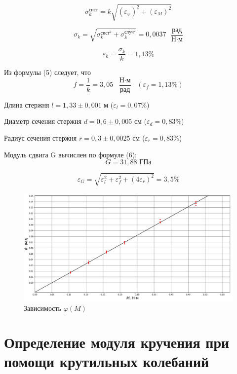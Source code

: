 \documentclass[a4paper, 12pt]{article}
\begin{document}
\[ \sigma_k^{\text{сист}} = k\sqrt{(\varepsilon_{\varphi})^2+(\varepsilon_M)^2}\]

\[ \sigma_{k} = \sqrt{\sigma_k^{{\text{сист}}^2}+\sigma_k^{{\text{случ}}^2}} = 0,0037 \text{ }\frac{\text{рад}}{\text{Н$\cdot$м}}\]

\[ \varepsilon_k = \frac{\sigma_k}{k} = 1,13 \%\]

Из формулы (5) следует, что
\[f = \frac{1}{k} = 3,05 \text{ }\frac{\text{Н$\cdot$м}}{\text{рад}}\text{ }(\varepsilon_f = 1,13 \%)\]

Длина стержня $l = 1,33 \pm 0,001$ м ($\varepsilon_l = 0,07\%$)

Диаметр сечения стержня $d = 0,6 \pm 0,005$ см ($\varepsilon_d = 0,83\%$)

Радиус сечения стержня $r = 0,3 \pm 0,0025$ см ($\varepsilon_r = 0,83\%$)

Модуль сдвига G вычислен по формуле (6):
\[G = 31,88 \text{ ГПа}\]

\[ \varepsilon_G = \sqrt{\varepsilon_l^2+\varepsilon_f^2+(4\varepsilon_r)^2} = 3,5 \%\]

 \begin{figure}[h!]
     \centering
     \includegraphics[scale = 0.5]{plota.png}
     \caption{Зависимость $\varphi(M)$}
     \label{fig:enter-label}
 \end{figure}


\section{Определение модуля кручения при помощи крутильных колебаний}
\end{document}
